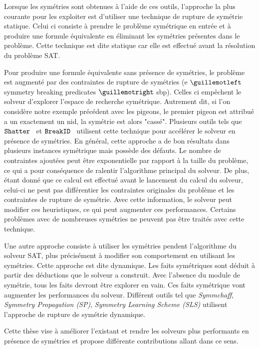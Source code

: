 Lorsque les symétries sont obtenues à l'aide de ces outils, l'approche la plus courante pour les exploiter est d'utiliser une technique de rupture de symétrie statique. Celui ci consiste à prendre le problème symétrique en entrée et à produire une formule équivalente en éliminant les symétries présentes dans le problème.
Cette technique est dite statique car elle est effectué avant la résolution du problème SAT. 

Pour produire une formule équivalente sans présence de symétries, le problème est augmenté par des 
contraintes de rupture de  symétries (e $\guillemotleft$symmetry breaking predicates $\guillemotright$ sbp). Celles ci empêchent le solveur d'explorer l'espace de recherche symétrique. 
Autrement dit, si l'on considère notre exemple précédent avec les pigeons, le premier pigeon est attribué a un
exactement un nid, la symétrie est alors "cassé".
Plusieurs outils tels que $\texttt{Shatter}$~\cite{} et $\texttt{BreakID}$~\cite{} utilisent cette technique pour accélérer le solveur en présence de symétries.
En général, cette approche a de bon résultats dans plusieurs instances symétrique mais possède des défauts.
Le nombre de contraintes ajoutées peut être exponentielle par rapport à la taille du problème, ce qui a
pour conséquence de ralentir l'algorithme principal du solveur. De plus, étant donné que ce calcul est effectué
avant le lancement du calcul du solveur, celui-ci ne peut pas différentier les contraintes originales du problème
et les contraintes de rupture de symétrie. Avec cette information, le solveur peut modifier ces heuristiques, ce 
qui peut augmenter ces performances.
Certains problèmes avec de nombreuses symétries ne peuvent pas être traités avec cette technique.

Une autre approche consiste à utiliser les symétries pendent l'algorithme du solveur SAT, plus précisément à modifier son comportement en utilisant les symétries.
Cette approche est dite dynamique.
Les faits symétriques sont déduit à partir des déductions que le solveur a construit. 
Avec l'absence du module de symétrie, tous les 
faits devront être explorer en vain. Ces faits symétrique vont augmenter les performances du solveur.
Différent outils tel que \textit{Symmchaff}, \textit{Symmetry Propagation (SP)}, \textit{Symmetry Learning Scheme (SLS)} utilisent l'approche de rupture de symétrie dynamique.


Cette thèse vise à améliorer l'existant et rendre les solveurs plus performants en présence de symétries et
propose différente contributions allant dans ce sens.  

